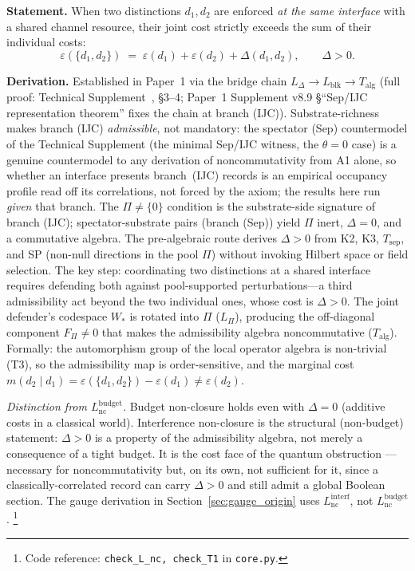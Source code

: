 \documentclass[11pt]{article}
\newcommand{\coderef}[2]{\footnote{Code reference: \texttt{#1} in \texttt{#2}.}}
\begin{document}
\begin{tcolorbox}[apfbox, title={Lemma $L_{\mathrm{nc}}^{\mathrm{interf}}$ (Interference Non-Closure)}]
\textbf{Statement.}  When two distinctions $d_1, d_2$ are enforced \emph{at the same interface} with a shared channel resource, their joint cost strictly exceeds the sum of their individual costs:
\begin{equation}
\varepsilon(\{d_1, d_2\}) \;=\; \varepsilon(d_1) + \varepsilon(d_2) + \Delta(d_1, d_2), \qquad \Delta > 0.
\label{eq:superadditivity}
\end{equation}

\smallskip\noindent\textbf{Derivation.}  Established in Paper~1 via the bridge chain $L_\Delta \to L_{\mathrm{blk}} \to T_{\mathrm{alg}}$ (full proof: Technical Supplement~\cite{BrookeSupplement}, \S3--4; Paper~1 Supplement v8.9 \S``Sep/IJC representation theorem'' fixes the chain at branch (IJC)).  Substrate-richness makes branch (IJC) \emph{admissible}, not mandatory: the spectator (Sep) countermodel of the Technical Supplement (the minimal Sep/IJC witness, the $\theta=0$ case) is a genuine countermodel to any derivation of noncommutativity from A1 alone, so whether an interface presents branch~(IJC) records is an empirical occupancy profile read off its correlations, not forced by the axiom; the results here run \emph{given} that branch.  The $\Pi \ne \{0\}$ condition is the substrate-side signature of branch (IJC); spectator-substrate pairs (branch (Sep)) yield $\Pi$ inert, $\Delta = 0$, and a commutative algebra.  The pre-algebraic route derives $\Delta > 0$ from K2, K3, $T_{\mathrm{sep}}$, and SP (non-null directions in the pool $\Pi$) without invoking Hilbert space or field selection.  The key step: coordinating two distinctions at a shared interface requires defending both against pool-supported perturbations---a third admissibility act beyond the two individual ones, whose cost is $\Delta > 0$.  The joint defender's codespace $W_*$ is rotated into $\Pi$ ($L_\Pi$), producing the off-diagonal component $F_\Pi \ne 0$ that makes the admissibility algebra noncommutative ($T_{\mathrm{alg}}$).  Formally: the automorphism group of the local operator algebra is non-trivial (T3), so the admissibility map is order-sensitive, and the marginal cost $m(d_2 \mid d_1) = \varepsilon(\{d_1,d_2\}) - \varepsilon(d_1) \ne \varepsilon(d_2)$.

\smallskip\noindent\textit{Distinction from $L_{\mathrm{nc}}^{\mathrm{budget}}$.}  Budget non-closure holds even with $\Delta = 0$ (additive costs in a classical world).  Interference non-closure is the structural (non-budget) statement: $\Delta > 0$ is a property of the admissibility algebra, not merely a consequence of a tight budget.  It is the cost face of the quantum obstruction --- necessary for noncommutativity but, on its own, not sufficient for it, since a classically-correlated record can carry $\Delta>0$ and still admit a global Boolean section.  The gauge derivation in Section~\ref{sec:gauge_origin} uses $L_{\mathrm{nc}}^{\mathrm{interf}}$, not $L_{\mathrm{nc}}^{\mathrm{budget}}$.
\coderef{check\_L\_nc, check\_T1}{core.py}
\end{tcolorbox}
\end{document}
